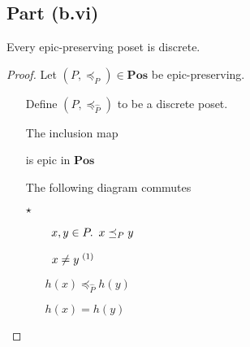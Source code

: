 \subsection{Part (b.vi)}\label{sec:q-1-b-vi}

\begin{prop}
  Every epic-preserving poset is discrete.

  \begin{proof}
    Let $(P,\preceq_P)\in\mathbf{Pos}$ be epic-preserving.
    \begin{itemize}
      \item[\phantom{\imps}]
        Define $(P, \preceq_{\hat{P}})$ to be a discrete poset.

      \item[\imps]
        The inclusion map
        is epic in $\mathbf{Pos}$

      \item[\imps] The following diagram commutes
        \begin{center}
        \end{center}

      \item[$\star$]
        \begin{itemize}
          \item[\phantom{\imps}]\Let~$x,y\in P\ldotp~x\preceq_P y$
            \marginnote{\Hyp}

          \item[\phantom{\imps}]\Ass~$x\neq y^{\text~(1)}$
            \marginnote{\Hyp}

          \item[\imps] $h(x) \preceq_{\hat{P}} h(y)$

          \item[\imps]
            $h(x) = h(y)$


\end{itemize}
\end{itemize}
\end{proof}
\end{prop}
